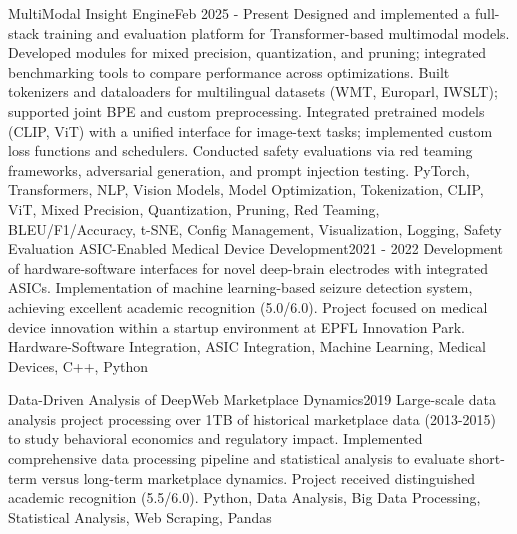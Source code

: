 %
%
%

\vspace*{-5mm}
\begin{projects}
\project
{MultiModal Insight Engine}{Feb 2025 - Present}
{}
{Designed and implemented a full-stack training and evaluation platform for Transformer-based multimodal models.
Developed modules for mixed precision, quantization, and pruning; integrated benchmarking tools to compare performance across optimizations.
Built tokenizers and dataloaders for multilingual datasets (WMT, Europarl, IWSLT); supported joint BPE and custom preprocessing.
Integrated pretrained models (CLIP, ViT) with a unified interface for image-text tasks; implemented custom loss functions and schedulers.
Conducted safety evaluations via red teaming frameworks, adversarial generation, and prompt injection testing.}
{PyTorch, Transformers, NLP, Vision Models, Model Optimization, Tokenization, CLIP, ViT, Mixed Precision, Quantization, Pruning, Red Teaming, BLEU/F1/Accuracy, t-SNE, Config Management, Visualization, Logging, Safety Evaluation}
\newpage
\project
{ASIC-Enabled Medical Device Development}{2021 - 2022}
{}
{Development of hardware-software interfaces for novel deep-brain electrodes with integrated ASICs. Implementation of machine learning-based seizure detection system, achieving excellent academic recognition (5.0/6.0). Project focused on medical device innovation within a startup environment at EPFL Innovation Park.}
{Hardware-Software Integration, ASIC Integration, Machine Learning, Medical Devices, C++, Python}


\project
{Data-Driven Analysis of DeepWeb Marketplace Dynamics}{2019}
{}
{Large-scale data analysis project processing over 1TB of historical marketplace data (2013-2015) to study behavioral economics and regulatory impact. Implemented comprehensive data processing pipeline and statistical analysis to evaluate short-term versus long-term marketplace dynamics. Project received distinguished academic recognition (5.5/6.0).}
{Python, Data Analysis, Big Data Processing, Statistical Analysis, Web Scraping, Pandas}


\end{projects}
